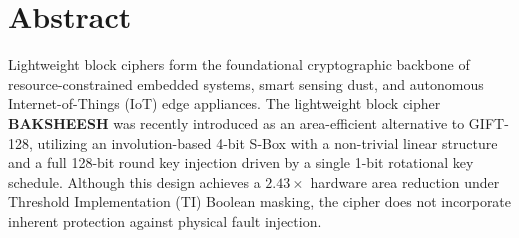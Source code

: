 \cleardoublepage

\chapter*{Abstract}

Lightweight block ciphers form the foundational cryptographic backbone of resource-constrained embedded systems, smart sensing dust, and autonomous Internet-of-Things (IoT) edge appliances. The lightweight block cipher \textbf{BAKSHEESH} was recently introduced as an area-efficient alternative to GIFT-128, utilizing an involution-based 4-bit S-Box with a non-trivial linear structure and a full 128-bit round key injection driven by a single 1-bit rotational key schedule. Although this design achieves a $2.43\times$ hardware area reduction under Threshold Implementation (TI) Boolean masking, the cipher does not incorporate inherent protection against physical fault injection.

